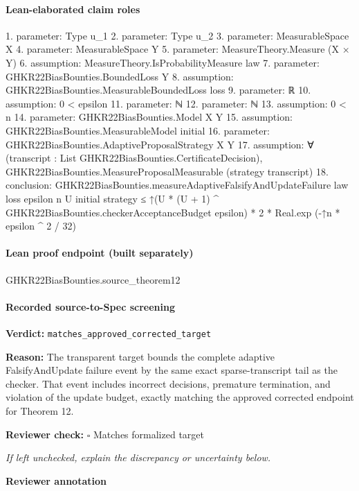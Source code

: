 \documentclass[10pt]{article}
\newcommand{\reviewerbox}{%
  \par\noindent\fbox{\parbox{0.96\linewidth}{\rule{0pt}{0.38in}}}\par
}
\newcommand{\reviewmatch}[1]{%
  \par\noindent\textbf{Reviewer check:} $\square$\; #1\par
  \noindent\emph{If left unchecked, explain the discrepancy or uncertainty below.}\par
}
\begin{document}
\paragraph{Lean-elaborated claim roles}\begin{ReviewVerbatim}
1. parameter: Type u_1
2. parameter: Type u_2
3. parameter: MeasurableSpace X
4. parameter: MeasurableSpace Y
5. parameter: MeasureTheory.Measure (X × Y)
6. assumption: MeasureTheory.IsProbabilityMeasure law
7. parameter: GHKR22BiasBounties.BoundedLoss Y
8. assumption: GHKR22BiasBounties.MeasurableBoundedLoss loss
9. parameter: ℝ
10. assumption: 0 < epsilon
11. parameter: ℕ
12. parameter: ℕ
13. assumption: 0 < n
14. parameter: GHKR22BiasBounties.Model X Y
15. assumption: GHKR22BiasBounties.MeasurableModel initial
16. parameter: GHKR22BiasBounties.AdaptiveProposalStrategy X Y
17. assumption: ∀ (transcript : List GHKR22BiasBounties.CertificateDecision),
  GHKR22BiasBounties.MeasureProposalMeasurable (strategy transcript)
18. conclusion: GHKR22BiasBounties.measureAdaptiveFalsifyAndUpdateFailure law loss epsilon n U initial strategy ≤
  ↑(U * (U + 1) ^ GHKR22BiasBounties.checkerAcceptanceBudget epsilon) * 2 * Real.exp (-↑n * epsilon ^ 2 / 32)
\end{ReviewVerbatim}

\paragraph{Lean proof endpoint (built separately)}\begin{ReviewVerbatim}
GHKR22BiasBounties.source_theorem12
\end{ReviewVerbatim}

\paragraph{Recorded source-to-Spec screening}
\textbf{Verdict:} \texttt{matches\_approved\_corrected\_target}
\\
{\raggedright
\textbf{Reason:} The transparent target bounds the complete adaptive FalsifyAndUpdate failure event by the same exact sparse-\allowbreak{}transcript tail as the checker.\allowbreak{} That event includes incorrect decisions, premature termination, and violation of the update budget, exactly matching the approved corrected endpoint for Theorem 12.\allowbreak{}
\par}
\reviewmatch{Matches formalized target}
\noindent\textbf{Reviewer annotation}\par
\reviewerbox
\clearpage
\hypertarget{source-claim-975541ba96125a10}{}
\end{document}
